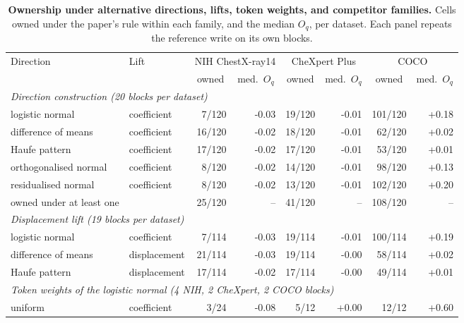 \begin{table}[h]
\centering
\scriptsize
\setlength{\tabcolsep}{4pt}
\caption{\textbf{Ownership under alternative directions, lifts, token weights, and competitor families.} Cells owned under the paper's rule within each family, and the median $O_q$, per dataset. Each panel repeats the reference write on its own blocks.}
\label{tab:cf-altdir}
\begin{tabular}{llrrrrrr}
\toprule
\multirow{2}{*}{Direction} & \multirow{2}{*}{Lift} & \multicolumn{2}{c}{NIH ChestX-ray14} & \multicolumn{2}{c}{CheXpert Plus} & \multicolumn{2}{c}{COCO}\\
\cmidrule(lr){3-4}\cmidrule(lr){5-6}\cmidrule(lr){7-8}
&  & \multicolumn{1}{c}{owned} & \multicolumn{1}{c}{med.\ $O_q$} & \multicolumn{1}{c}{owned} & \multicolumn{1}{c}{med.\ $O_q$} & \multicolumn{1}{c}{owned} & \multicolumn{1}{c}{med.\ $O_q$}\\
\midrule
\multicolumn{8}{l}{\textit{Direction construction (20 blocks per dataset)}} \\
\quad logistic normal & coefficient & 7/120 & -0.03 & 19/120 & -0.01 & 101/120 & +0.18 \\
\quad difference of means & coefficient & 16/120 & -0.02 & 18/120 & -0.01 & 62/120 & +0.02 \\
\quad Haufe pattern & coefficient & 17/120 & -0.02 & 17/120 & -0.01 & 53/120 & +0.01 \\
\quad orthogonalised normal & coefficient & 8/120 & -0.02 & 14/120 & -0.01 & 98/120 & +0.13 \\
\quad residualised normal & coefficient & 8/120 & -0.02 & 13/120 & -0.01 & 102/120 & +0.20 \\
\quad owned under at least one &  & 25/120 & -- & 41/120 & -- & 108/120 & -- \\
\midrule
\multicolumn{8}{l}{\textit{Displacement lift (19 blocks per dataset)}} \\
\quad logistic normal & coefficient & 7/114 & -0.03 & 19/114 & -0.01 & 100/114 & +0.19 \\
\quad difference of means & displacement & 21/114 & -0.03 & 19/114 & -0.00 & 58/114 & +0.02 \\
\quad Haufe pattern & displacement & 17/114 & -0.02 & 17/114 & -0.00 & 49/114 & +0.01 \\
\midrule
\multicolumn{8}{l}{\textit{Token weights of the logistic normal (4 NIH, 2 CheXpert, 2 COCO blocks)}} \\
\quad uniform & coefficient & 3/24 & -0.08 & 5/12 & +0.00 & 12/12 & +0.60 \\

\end{tabular}
\end{table}
